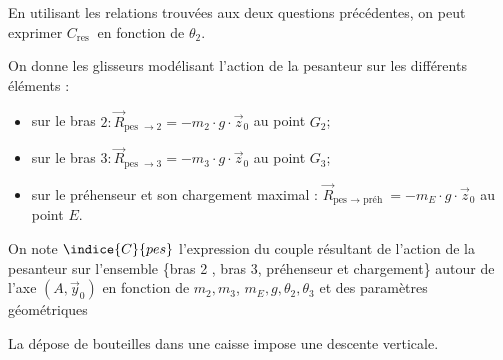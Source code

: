 
En utilisant les relations trouvées aux deux questions précédentes, on peut exprimer $C_{\text {res }}$ en fonction de $\theta_{2}$.

On donne les glisseurs modélisant l'action de la pesanteur sur les différents éléments :
\begin{itemize}
  \item sur le bras $2: \vec{R}_{\text {pes } \rightarrow 2}=-m_{2} \cdot g \cdot \vec{z}_{0}$ au point $G_{2}$;
  \item sur le bras $3: \vec{R}_{\text {pes } \rightarrow 3}=-m_{3} \cdot g \cdot \vec{z}_{0}$ au point $G_{3}$;
  \item sur le préhenseur et son chargement maximal : $\vec{R}_{\text {pes } \rightarrow \text { préh }}=-m_{E} \cdot g \cdot \vec{z}_{0}$ au point $E$.
\end{itemize}


On note $\indice{C}{pes}$ l'expression du couple résultant de l'action de la pesanteur sur l'ensemble \{bras 2 , bras 3, préhenseur et chargement\} autour de l'axe $\left(A, \vec{y}_{0}\right)$ en fonction de $m_{2}, m_{3}$, $m_{E}, g, \theta_{2}, \theta_{3}$ et des paramètres géométriques




La dépose de bouteilles dans une caisse impose une descente verticale.%



